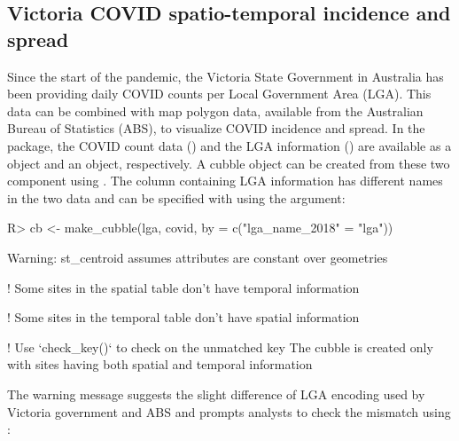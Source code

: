 \documentclass[
  shortnames]{jss}
\begin{document}
\hypertarget{covid}{%
\subsection{Victoria COVID spatio-temporal incidence and spread}\label{covid}}

Since the start of the pandemic, the Victoria State Government in Australia has been providing daily COVID counts per Local Government Area (LGA). This data can be combined with map polygon data, available from the Australian Bureau of Statistics (ABS), to visualize COVID incidence and spread. In the  package, the COVID count data () and the LGA information () are available as a  object and an  object, respectively. A cubble object can be created from these two component using . The  column containing LGA information has different names in the two data and can be specified with using the  argument:

\begin{CodeChunk}
\begin{CodeInput}
R> cb <- make_cubble(lga, covid, by = c("lga_name_2018" = "lga"))
\end{CodeInput}
\begin{CodeOutput}
Warning: st_centroid assumes attributes are constant over geometries
\end{CodeOutput}
\begin{CodeOutput}
! Some sites in the spatial table don't have temporal information
\end{CodeOutput}
\begin{CodeOutput}
! Some sites in the temporal table don't have spatial information
\end{CodeOutput}
\begin{CodeOutput}
! Use `check_key()` to check on the unmatched key
The cubble is created only with sites having both spatial and
temporal information
\end{CodeOutput}
\end{CodeChunk}

The warning message suggests the slight difference of LGA encoding used by Victoria government and ABS and prompts analysts to check the mismatch using :
\end{document}
